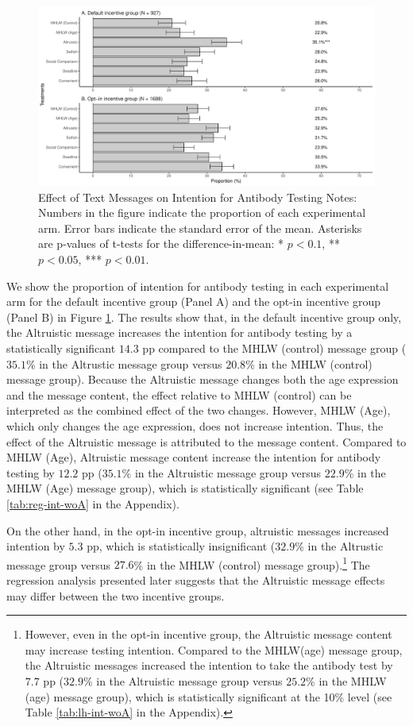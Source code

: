 \documentclass[
]{article}
\begin{document}
\begin{figure}
\centering
\includegraphics{discussion-paper_files/figure-latex/ttest-int-test-1.pdf}
\caption{\label{fig:ttest-int-test}Effect of Text Messages on Intention for Antibody Testing Notes: Numbers in the figure indicate the proportion of each experimental arm. Error bars indicate the standard error of the mean. Asterisks are p-values of t-tests for the difference-in-mean: * \(p < 0.1\), ** \(p < 0.05\), *** \(p < 0.01\).}
\end{figure}

We show the proportion of intention for antibody testing in each experimental arm for the default incentive group (Panel A) and the opt-in incentive group (Panel B) in Figure \ref{fig:ttest-int-test}. The results show that, in the default incentive group only, the Altruistic message increases the intention for antibody testing by a statistically significant \(14.3\) pp compared to the MHLW (control) message group (\(35.1\)\% in the Altrustic message group versus \(20.8\)\% in the MHLW (control) message group). Because the Altruistic message changes both the age expression and the message content, the effect relative to MHLW (control) can be interpreted as the combined effect of the two changes. However, MHLW (Age), which only changes the age expression, does not increase intention. Thus, the effect of the Altruistic message is attributed to the message content. Compared to MHLW (Age), Altruistic message content increase the intention for antibody testing by \(12.2\) pp (\(35.1\)\% in the Altruistic message group versus \(22.9\)\% in the MHLW (Age) message group), which is statistically significant (see Table \ref{tab:reg-int-woA} in the Appendix).

On the other hand, in the opt-in incentive group, altruistic messages increased intention by \(5.3\) pp, which is statistically insignificant (\(32.9\)\% in the Altrustic message group versus \(27.6\)\% in the MHLW (control) message group).\footnote{However, even in the opt-in incentive group, the Altruistic message content may increase testing intention. Compared to the MHLW(age) message group, the Altruistic messages increased the intention to take the antibody test by \(7.7\) pp (\(32.9\)\% in the Altruistic message group versus \(25.2\)\% in the MHLW (age) message group), which is statistically significant at the 10\% level (see Table \ref{tab:lh-int-woA} in the Appendix).} The regression analysis presented later suggests that the Altruistic message effects may differ between the two incentive groups.
\end{document}
